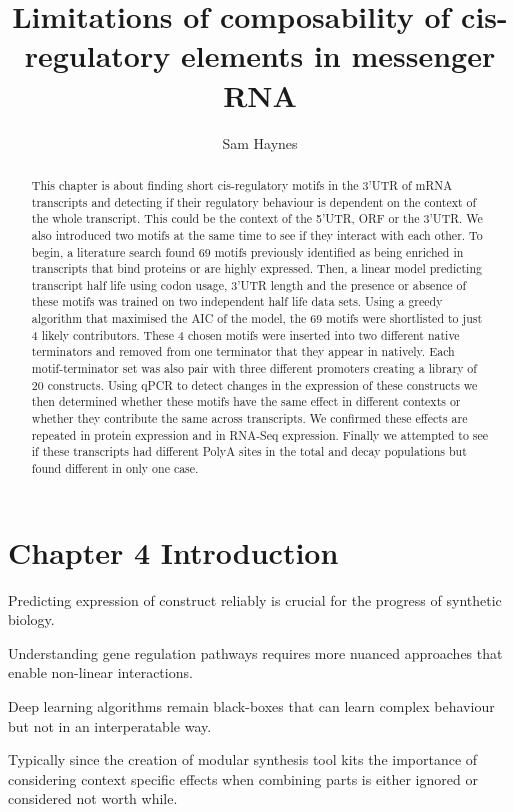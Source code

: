 \documentclass{SBCbookchapter}
\author{Sam Haynes}
\title{{Limitations} of composability of cis-regulatory elements in messenger RNA}
\begin{document}
\maketitle

\begin{abstract}
This chapter is about finding short cis-regulatory motifs in the 3'UTR of mRNA transcripts and detecting if their regulatory behaviour is dependent on the context of the whole transcript. This could be the context of the 5'UTR, ORF or the 3'UTR. We also introduced two motifs at the same time to see if they interact with each other. To begin, a literature search found 69 motifs previously identified as being enriched in transcripts that bind proteins or are highly expressed. Then, a linear model predicting transcript half life using codon usage, 3'UTR length and the presence or absence of these motifs was trained on two independent half life data sets. Using a greedy algorithm that maximised the AIC of the model, the 69 motifs were shortlisted to just 4 likely contributors. These 4 chosen motifs were inserted into two different native terminators and removed from one terminator that they appear in natively. Each motif-terminator set was also pair with three different promoters creating a library of 20 constructs. Using qPCR to detect changes in the expression of these constructs we then determined whether these motifs have the same effect in different contexts or whether they contribute the same across transcripts. We confirmed these effects are repeated in protein expression and in RNA-Seq expression. Finally we attempted to see if these transcripts had different PolyA sites in the total and decay populations but found different in only one case.
\end{abstract}

\section{Chapter 4 Introduction}

Predicting expression of construct reliably is crucial for the progress of synthetic biology.

Understanding gene regulation pathways requires more nuanced approaches that enable non-linear interactions. 

Deep learning algorithms remain black-boxes that can learn complex behaviour but not in an interperatable way.

Typically since the creation of modular synthesis tool kits the importance of considering context specific effects when combining parts is either ignored or considered not worth while.
\end{document}
